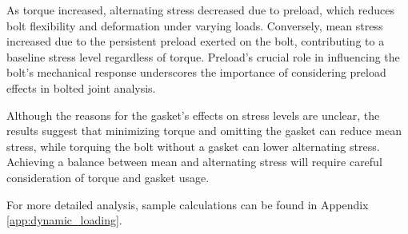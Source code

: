As torque increased, alternating stress decreased due to preload, which reduces bolt flexibility and deformation under varying loads. Conversely, mean stress increased due to the persistent preload exerted on the bolt, contributing to a baseline stress level regardless of torque. Preload's crucial role in influencing the bolt's mechanical response underscores the importance of considering preload effects in bolted joint analysis.

Although the reasons for the gasket's effects on stress levels are unclear, the results suggest that minimizing torque and omitting the gasket can reduce mean stress, while torquing the bolt without a gasket can lower alternating stress. Achieving a balance between mean and alternating stress will require careful consideration of torque and gasket usage.

For more detailed analysis, sample calculations can be found in Appendix \ref{app:dynamic_loading}.